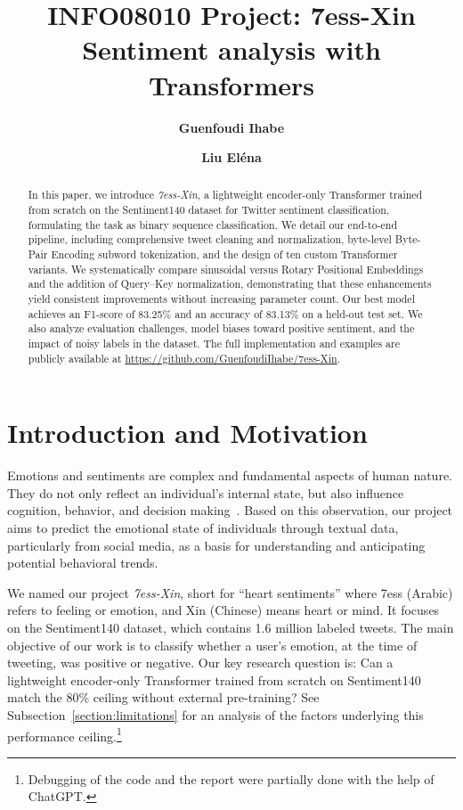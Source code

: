 \documentclass[twocolumn,superscriptaddress,aps]{revtex4-1}
\begin{document}
\title{\Large{INFO08010 Project: 7ess-Xin \\ Sentiment analysis with Transformers}}
\vspace{1cm}
\author{\small{\bf Guenfoudi Ihabe }}
\author{\small{\bf Liu Eléna}}

\begin{abstract}
    In this paper, we introduce \textit{7ess-Xin}, a lightweight encoder-only Transformer trained from scratch on the Sentiment140 dataset for Twitter sentiment classification, formulating the task as binary sequence classification. We detail our end-to-end pipeline, including comprehensive tweet cleaning and normalization, byte-level Byte-Pair Encoding subword tokenization, and the design of ten custom Transformer variants. We systematically compare sinusoidal versus Rotary Positional Embeddings and the addition of Query–Key normalization, demonstrating that these enhancements yield consistent improvements without increasing parameter count. Our best model achieves an F1-score of 83.25\% and an accuracy of 83.13\% on a held-out test set. We also analyze evaluation challenges, model biases toward positive sentiment, and the impact of noisy labels in the dataset. The full implementation and examples are publicly available at \url{https://github.com/GuenfoudiIhabe/7ess-Xin}.
\end{abstract}
\maketitle

\section{Introduction and Motivation}
Emotions and sentiments are complex and fundamental aspects of human nature. They do not only reflect an individual's internal state, but also influence cognition, behavior, and decision making~\cite{cacioppo2016human}. Based on this observation, our project aims to predict the emotional state of individuals through textual data, particularly from social media, as a basis for understanding and anticipating potential behavioral trends.

We named our project \textit{7ess-Xin}, short for ``heart sentiments'' where 7ess (Arabic) refers to feeling or emotion, and Xin (Chinese) means heart or mind. It focuses on the Sentiment140 dataset, which contains 1.6 million labeled tweets. The main objective of our work is to classify whether a user's emotion, at the time of tweeting, was positive or negative.
Our key research question is: Can a lightweight encoder-only Transformer trained from scratch on Sentiment140 match the 80\% ceiling without external pre-training? See Subsection~\ref{section:limitations} for an analysis of the factors underlying this performance ceiling.\footnote{Debugging of the code and the report were partially done with the help of ChatGPT.}
\end{document}
